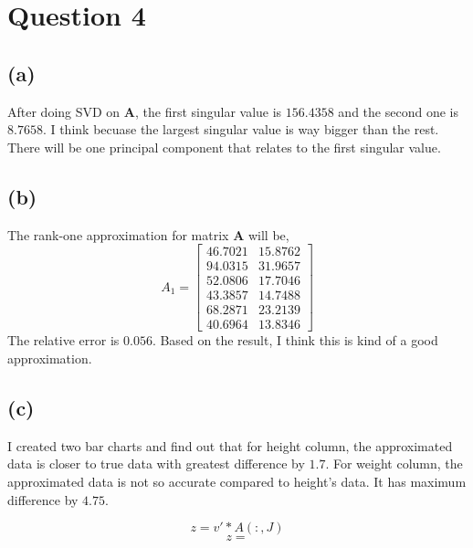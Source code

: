 \documentclass{article}
\newcommand{\bmat}[1]{\begin{bmatrix} #1 \end{bmatrix}}
\newcommand{\mat}[1]{\mathbf{#1}}
\begin{document}
\section*{Question 4}
\subsection*{(a)}
After doing SVD on $\mat{A}$, the first singular value is $156.4358$ and the second one is $8.7658$. I think 
becuase the largest singular value is way bigger than the rest. There will be
one principal component that relates to the first singular value.
\subsection*{(b)}

The rank-one approximation for matrix $\mat{A}$ will be, 
$$A_1 = \bmat{ 46.7021 &  15.8762\\
94.0315 &  31.9657 \\
52.0806  & 17.7046\\
43.3857  & 14.7488\\
68.2871  & 23.2139\\
40.6964  & 13.8346}$$
The relative error is $0.056$. Based on the result, I think this is kind of a good
approximation.

\subsection*{(c)}
I created two bar charts and find out that for height column, the approximated 
data is closer to true data with greatest difference by $1.7$. For weight column,
the approximated data is not so accurate compared to height's data. It has maximum difference 
by $4.75$.









$$z = v' * A(:,J)$$
$$z = $$
\end{document}
